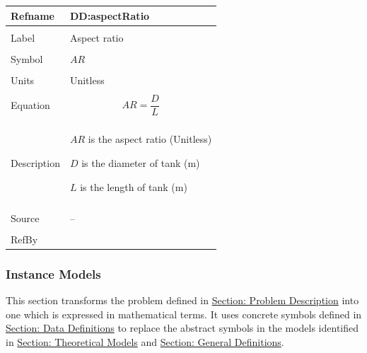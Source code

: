 \documentclass[12pt]{article}
\begin{document}
\vspace{\baselineskip}
\noindent
\begin{minipage}{\textwidth}
\begin{tabular}{>{\raggedright}p{}>{\raggedright\arraybackslash}p{}}
\toprule \textbf{Refname} & \textbf{DD:aspectRatio}
\label{DD:aspectRatio}
\\ \midrule \\
Label & Aspect ratio
        
\\ \midrule \\
Symbol & $AR$
         
\\ \midrule \\
Units & Unitless
        
\\ \midrule \\
Equation & \begin{displaymath}
           AR=\frac{D}{L}
           \end{displaymath}
\\ \midrule \\
Description & \begin{symbDescription}
              \item{$AR$ is the aspect ratio (Unitless)}
              \item{$D$ is the diameter of tank (m)}
              \item{$L$ is the length of tank (m)}
              \end{symbDescription}
\\ \midrule \\
Source & --
         
\\ \midrule \\
RefBy & 
\\ \bottomrule
\end{tabular}
\end{minipage}

\subsubsection{Instance Models}
\label{Sec:IMs}
This section transforms the problem defined in \hyperref[Sec:ProbDesc]{Section: Problem Description} into one which is expressed in mathematical terms. It uses concrete symbols defined in \hyperref[Sec:DDs]{Section: Data Definitions} to replace the abstract symbols in the models identified in \hyperref[Sec:TMs]{Section: Theoretical Models} and \hyperref[Sec:GDs]{Section: General Definitions}.
\end{document}
